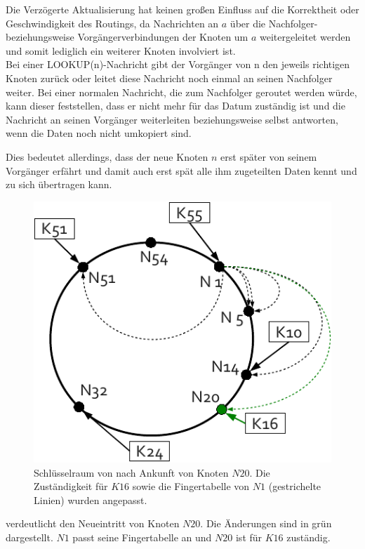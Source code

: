 Die Verzögerte Aktualisierung hat keinen großen Einfluss auf die Korrektheit oder Geschwindigkeit des Routings, da Nachrichten an $a$ über die Nachfolger- beziehungsweise Vorgängerverbindungen der Knoten um $a$ weitergeleitet werden und somit lediglich ein weiterer Knoten involviert ist.\\
Bei einer LOOKUP(n)-Nachricht gibt der Vorgänger von n den jeweils richtigen Knoten zurück oder leitet diese Nachricht noch einmal an seinen Nachfolger weiter. Bei einer normalen Nachricht, die zum Nachfolger geroutet werden würde, kann dieser feststellen, dass er nicht mehr für das Datum zuständig ist und die Nachricht an seinen Vorgänger weiterleiten beziehungsweise selbst antworten, wenn die Daten noch nicht umkopiert sind. 

Dies bedeutet allerdings, dass der neue Knoten $n$ erst später von seinem Vorgänger erfährt und damit auch erst spät alle ihm zugeteilten Daten kennt und zu sich übertragen kann.

\begin{figure}[htbp]
\centering
\includegraphics{grafics/chord_new_node.pdf}
\caption{Schlüsselraum von  nach Ankunft von Knoten $N20$. Die Zuständigkeit für $K16$ sowie die Fingertabelle von $N1$ (gestrichelte Linien) wurden angepasst.}
\label{fig:chord_new_node}
\end{figure}

 verdeutlicht den Neueintritt von Knoten $N20$. Die Änderungen sind in grün dargestellt. $N1$ passt seine Fingertabelle an und $N20$ ist für $K16$ zuständig.


